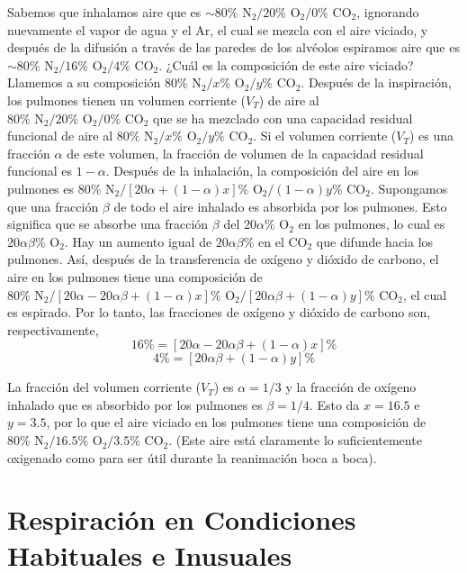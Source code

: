 \documentclass[12pt]{book}
\begin{document}
Sabemos que inhalamos aire que es $\sim 80\%\text{ N}_2 / 20\%\text{ O}_2 / 0\%\text{ CO}_2$, ignorando nuevamente el vapor de agua y el $\text{Ar}$, el cual se mezcla con el aire viciado, y después de la difusión a través de las paredes de los alvéolos espiramos aire que es $\sim 80\%\text{ N}_2 / 16\%\text{ O}_2 / 4\%\text{ CO}_2$. ¿Cuál es la composición de este aire viciado? Llamemos a su composición $80\%\text{ N}_2 / x\%\text{ O}_2 / y\%\text{ CO}_2$. Después de la inspiración, los pulmones tienen un volumen corriente ($V_T$) de aire al $80\%\text{ N}_2 / 20\%\text{ O}_2 / 0\%\text{ CO}_2$ que se ha mezclado con una capacidad residual funcional de aire al $80\%\text{ N}_2 / x\%\text{ O}_2 / y\%\text{ CO}_2$. Si el volumen corriente ($V_T$) es una fracción $\alpha$ de este volumen, la fracción de volumen de la capacidad residual funcional es $1 - \alpha$. Después de la inhalación, la composición del aire en los pulmones es $80\%\text{ N}_2 / [20\alpha + (1 - \alpha)x]\%\text{ O}_2 / (1 - \alpha)y\%\text{ CO}_2$. Supongamos que una fracción $\beta$ de todo el aire inhalado es absorbida por los pulmones. Esto significa que se absorbe una fracción $\beta$ del $20\alpha\%\text{ O}_2$ en los pulmones, lo cual es $20\alpha\beta\%\text{ O}_2$. Hay un aumento igual de $20\alpha\beta\%$ en el $\text{CO}_2$ que difunde hacia los pulmones. Así, después de la transferencia de oxígeno y dióxido de carbono, el aire en los pulmones tiene una composición de $80\%\text{ N}_2 / [20\alpha - 20\alpha\beta + (1 - \alpha)x]\%\text{ O}_2 / [20\alpha\beta + (1 - \alpha)y]\%\text{ CO}_2$, el cual es espirado. Por lo tanto, las fracciones de oxígeno y dióxido de carbono son, respectivamente,
\begin{equation}
16\% = [20\alpha - 20\alpha\beta + (1 - \alpha)x]\% \label{eq:9.9}
\end{equation}
\begin{equation}
4\% = [20\alpha\beta + (1 - \alpha)y]\% \label{eq:9.10}
\end{equation}

La fracción del volumen corriente ($V_T$) es $\alpha = 1/3$ y la fracción de oxígeno inhalado que es absorbido por los pulmones es $\beta = 1/4$. Esto da $x = 16.5$ e $y = 3.5$, por lo que el aire viciado en los pulmones tiene una composición de $80\%\text{ N}_2 / 16.5\%\text{ O}_2 / 3.5\%\text{ CO}_2$. (Este aire está claramente lo suficientemente oxigenado como para ser útil durante la reanimación boca a boca).

\FloatBarrier
\section{Respiración en Condiciones Habituales e Inusuales} \label{sec:9.5}
\end{document}
